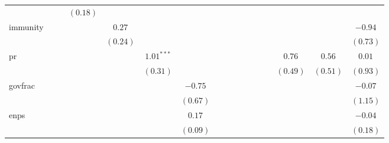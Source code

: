 \documentclass[a4paper]{article}\usepackage{graphicx, color}
\begin{document}
\begin{landscape}
\begin{table}
{{\begin{tabular}{l c c c c c c c c c c c c c c c c }
                    &               &               & $(0.18)$      &               &               &               &               &               &               &          &               &          &          &              &              &                     \\
immunity            &               &               &               & $0.27$        &               &               &               &               &               &          &               &          &          &              &              & $-0.94$             \\
                    &               &               &               & $(0.24)$      &               &               &               &               &               &          &               &          &          &              &              & $(0.73)$            \\
pr                  &               &               &               &               & $1.01^{***}$  &               &               &               &               &          &               &          &          & $0.76$       & $0.56$       & $0.01$              \\
                    &               &               &               &               & $(0.31)$      &               &               &               &               &          &               &          &          & $(0.49)$     & $(0.51)$     & $(0.93)$            \\
govfrac             &               &               &               &               &               & $-0.75$       &               &               &               &          &               &          &          &              &              & $-0.07$             \\
                    &               &               &               &               &               & $(0.67)$      &               &               &               &          &               &          &          &              &              & $(1.15)$            \\
enps                &               &               &               &               &               & $0.17$        &               &               &               &          &               &          &          &              &              & $-0.04$             \\
                    &               &               &               &               &               & $(0.09)$      &               &               &               &          &               &          &          &              &              & $(0.18)$            \\

\end{tabular}}}
\end{table}
\end{landscape}
\end{document}
